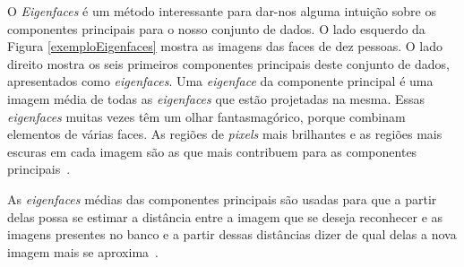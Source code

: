 


O \textit{Eigenfaces} é um método interessante para dar-nos alguma intuição sobre os componentes principais para o nosso conjunto de dados. O lado esquerdo da Figura \ref{exemploEigenfaces} mostra as imagens das faces de dez pessoas. O lado direito  mostra os seis primeiros componentes principais deste conjunto de dados, apresentados como \textit{eigenfaces}. Uma \textit{eigenface} da componente principal é uma imagem média de todas as \textit{eigenfaces} que estão projetadas na mesma. Essas \textit{eigenfaces} muitas vezes têm um olhar fantasmagórico, porque combinam elementos de várias faces. As regiões de \textit{pixels} mais brilhantes e as regiões mais escuras em cada imagem são as que mais contribuem para as componentes principais~\cite{hewitt}. 

As \textit{eigenfaces} médias das componentes principais são usadas para que a partir delas possa se estimar a distância entre a imagem que se deseja reconhecer e as imagens presentes no banco e a partir dessas distâncias dizer de qual delas a nova imagem mais se aproxima~\cite{turkpentland}.


